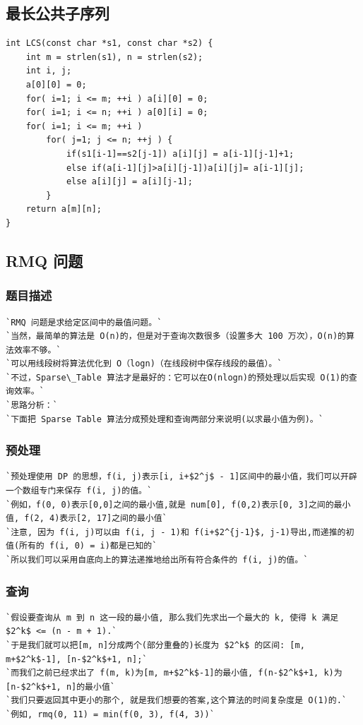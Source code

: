 \documentclass[a4paper]{article}
\begin{document}
\begin{CJK*}{UTF8}{gbsn}
\begin{multicols}{3}
\begin{flushleft}
\subsection{最长公共子序列}
\begin{lstlisting}
int LCS(const char *s1, const char *s2) {
    int m = strlen(s1), n = strlen(s2);
    int i, j;
    a[0][0] = 0;
    for( i=1; i <= m; ++i ) a[i][0] = 0;
    for( i=1; i <= n; ++i ) a[0][i] = 0;
    for( i=1; i <= m; ++i )
        for( j=1; j <= n; ++j ) {
            if(s1[i-1]==s2[j-1]) a[i][j] = a[i-1][j-1]+1;
            else if(a[i-1][j]>a[i][j-1])a[i][j]= a[i-1][j];
            else a[i][j] = a[i][j-1];
        }
    return a[m][n];
}
\end{lstlisting}

\subsection{RMQ 问题}

\subsubsection{题目描述}
\begin{lstlisting}
`RMQ 问题是求给定区间中的最值问题。`
`当然，最简单的算法是 O(n)的，但是对于查询次数很多（设置多大 100 万次），O(n)的算法效率不够。`
`可以用线段树将算法优化到 O（logn)（在线段树中保存线段的最值）。`
`不过，Sparse\_Table 算法才是最好的：它可以在O(nlogn)的预处理以后实现 O(1)的查询效率。`
`思路分析：`
`下面把 Sparse Table 算法分成预处理和查询两部分来说明(以求最小值为例)。`
\end{lstlisting}

\subsubsection{预处理}
\begin{lstlisting}
`预处理使用 DP 的思想，f(i, j)表示[i, i+$2^j$ - 1]区间中的最小值，我们可以开辟一个数组专门来保存 f(i, j)的值。`
`例如，f(0, 0)表示[0,0]之间的最小值,就是 num[0], f(0,2)表示[0, 3]之间的最小值, f(2, 4)表示[2, 17]之间的最小值`
`注意, 因为 f(i, j)可以由 f(i, j - 1)和 f(i+$2^{j-1}$, j-1)导出,而递推的初值(所有的 f(i, 0) = i)都是已知的`
`所以我们可以采用自底向上的算法递推地给出所有符合条件的 f(i, j)的值。`
\end{lstlisting}

\subsubsection{查询}
\begin{lstlisting}
`假设要查询从 m 到 n 这一段的最小值, 那么我们先求出一个最大的 k, 使得 k 满足 $2^k$ <= (n - m + 1).`
`于是我们就可以把[m, n]分成两个(部分重叠的)长度为 $2^k$ 的区间: [m, m+$2^k$-1], [n-$2^k$+1, n];`
`而我们之前已经求出了 f(m, k)为[m, m+$2^k$-1]的最小值, f(n-$2^k$+1, k)为[n-$2^k$+1, n]的最小值`
`我们只要返回其中更小的那个, 就是我们想要的答案,这个算法的时间复杂度是 O(1)的.`
`例如, rmq(0, 11) = min(f(0, 3), f(4, 3))`
\end{lstlisting}


\end{flushleft}
\end{multicols}
\end{CJK*}
\end{document}
